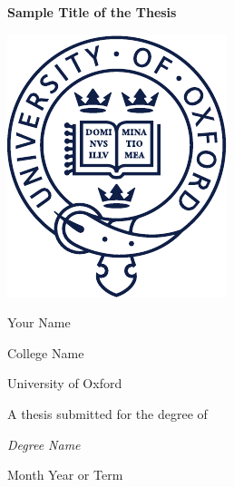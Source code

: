 \begin{titlepage}
    \null
    \renewcommand{\footnotesize}{\small}
    \renewcommand{\footnoterule}{\relax}
    \thispagestyle{empty}
    \begin{center}
    {\LARGE \bfseries Sample Title of the Thesis \par}
    {\large \vspace*{30mm} \includegraphics{functional-pages/figures/ox-beltcrest.pdf} \par \vspace*{25mm}} %
    {\Large Your Name \par}
    {\large \vspace*{1ex}
    {College Name \par}
    \vspace*{1ex}
    {University of Oxford \par}
    \vspace*{20mm}
    {A thesis submitted for the degree of \par}
    \vspace*{1ex}
    {\it Degree Name \par}
    \vspace*{2ex}
    {Month Year or Term}}
    \end{center}
    \vfill\null
\end{titlepage}